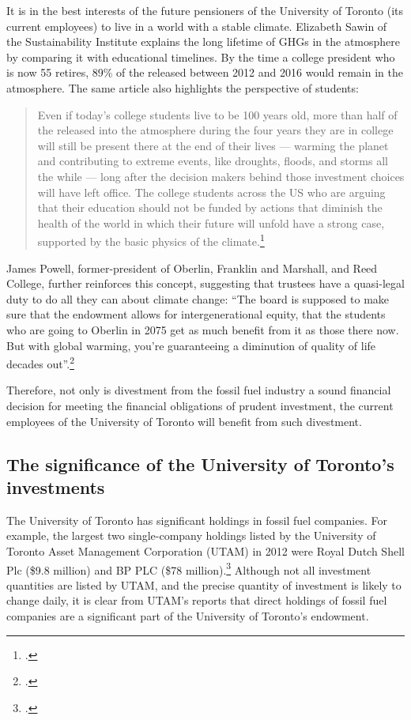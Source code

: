 It is in the best interests of the future pensioners of the University of Toronto (its current employees) to live in a world with a stable climate.
Elizabeth Sawin of the Sustainability Institute explains the long lifetime of GHGs in the atmosphere by comparing it with educational timelines.
By the time a college president who is now 55 retires, 89\% of the  released between 2012 and 2016 would remain in the atmosphere.
The same article also highlights the perspective of students: 
\begin{quote}
Even if today's college students live to be 100 years old, more than half of the  released into the atmosphere during the four years they are in college will still be present there at the end of their lives --- warming the planet and contributing to extreme events, like droughts, floods, and storms all the while --- long after the decision makers behind those investment choices will have left office. The college students across the US who are arguing that their education should not be funded by actions that diminish the health of the world in which their future will unfold have a strong case, supported by the basic physics of the climate.\footcite{ClimateInteractivePersist}
\end{quote}
James Powell, former-president of Oberlin, Franklin and Marshall, and Reed College, further reinforces this concept, suggesting that trustees have a quasi-legal duty to do all they can about climate change: ``The board is supposed to make sure that the endowment allows for intergenerational equity, that the students who are going to Oberlin in 2075 get as much benefit from it as those there now. But with global warming, you're guaranteeing a diminution of quality of life decades out''.\footcite{CaseForDivestment}



Therefore, not only is divestment from the fossil fuel industry a sound financial decision for meeting the financial obligations of prudent investment, the current employees of the University of Toronto will benefit from such divestment.



		\subsection{The significance of the University of Toronto's investments}



The University of Toronto has significant holdings in fossil fuel companies.
For example, the largest two single-company holdings listed by the University of Toronto Asset Management Corporation (UTAM) in 2012 were Royal Dutch Shell Plc (\$9.8 million) and BP PLC (\$78 million).\footcite{UTAM_2012_Int}
Although not all investment quantities are listed by UTAM, and the precise quantity of investment is likely to change daily, it is clear from UTAM's reports that direct holdings of fossil fuel companies are a significant part of the University of Toronto's endowment.



